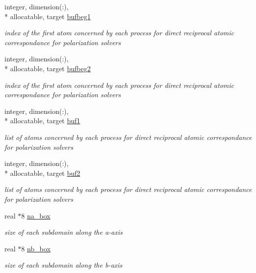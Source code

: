 \begin{DoxyCompactItemize}
integer, dimension(\-:), \\*
allocatable, target \hyperlink{classdomdec_a0da0b0f870e5a272cd7af8a6a7b8d393}{bufbeg1}
\begin{DoxyCompactList}\small\item\em index of the first atom concerned by each process for direct reciprocal atomic correspondance for polarization solvers \end{DoxyCompactList}\item 
integer, dimension(\-:), \\*
allocatable, target \hyperlink{classdomdec_a00263858ce6582864a5ed17d590b8e7a}{bufbeg2}
\begin{DoxyCompactList}\small\item\em index of the first atom concerned by each process for direct reciprocal atomic correspondance for polarization solvers \end{DoxyCompactList}\item 
integer, dimension(\-:), \\*
allocatable, target \hyperlink{classdomdec_a7d90558349e9925b91eb336db7059b8d}{buf1}
\begin{DoxyCompactList}\small\item\em list of atoms concerned by each process for direct reciprocal atomic correspondance for polarization solvers \end{DoxyCompactList}\item 
integer, dimension(\-:), \\*
allocatable, target \hyperlink{classdomdec_a0defed117c2c62aa11dd777d8748b6de}{buf2}
\begin{DoxyCompactList}\small\item\em list of atoms concerned by each process for direct reciprocal atomic correspondance for polarization solvers \end{DoxyCompactList}\item 
real $\ast$8 \hyperlink{classdomdec_a6fbb2670015481430ce47e763a530408}{na\-\_\-box}
\begin{DoxyCompactList}\small\item\em size of each subdomain along the a-\/axis \end{DoxyCompactList}\item 
real $\ast$8 \hyperlink{classdomdec_a8f096ca3b8d296c40a28eb015490f11c}{nb\-\_\-box}
\begin{DoxyCompactList}\small\item\em size of each subdomain along the b-\/axis \end{DoxyCompactList}\item 

\end{DoxyCompactItemize}
